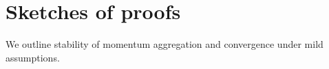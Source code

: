 \documentclass{article}
\begin{document}
\section{Sketches of proofs}
We outline stability of momentum aggregation and convergence under mild assumptions.
\end{document}
